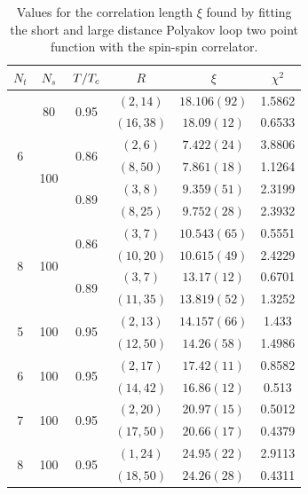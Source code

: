 \documentclass[reqno,12pt]{article}
\numberwithin{equation}{section}
\begin{document}
\begin{table}[h]
	\centering
	\begin{tabular}{|c|c|c|c|c|c|}
		\hline
		$N_t$ & $N_s$ & $\flatfrac{T}{T_c} $ & $R$ & $\xi$ & $\chi^2$ \\
		\hline
		\multirow{6}{*}{6} 
			& \multirow{2}{*}{80}
				& \multirow{2}{*}{0.95}
					& $(2, 14)$  & $18.106(92)$ & 1.5862 \\
				& & & $(16, 38)$ & $18.09(12)$  & 0.6533 \\
			\cline{2-6}
			& \multirow{4}{*}{100} 
				& \multirow{2}{*}{0.86} 
					& $(2, 6)$   & $7.422(24)$ & 3.8806 \\
					& & & $(8, 50)$ & $7.861(18)$  & 1.1264 \\
					\cline{3-6}
				& & \multirow{2}{*}{0.89} 
					& $(3, 8)$   & $9.359(51)$ & 2.3199 \\
					& & & $(8, 25)$  & $9.752(28)$ & 2.3932 \\
		\hline
		\multirow{4}{*}{8} & \multirow{4}{*}{100}
				& \multirow{2}{*}{0.86}
					& $(3, 7)$  & $10.543(65)$ & 0.5551 \\
				& & & $(10, 20)$ & $10.615(49)$  & 2.4229 \\
			\cline{3-6}
				& & \multirow{2}{*}{0.89}
					& $(3, 7)$   & $13.17(12)$  & 0.6701 \\
				& & & $(11, 35)$ & $13.819(52)$ & 1.3252 \\
		\hline
		\multirow{2}{*}{5} & \multirow{2}{*}{100} & \multirow{2}{*}{0.95}
			    & $(2, 13)$ & $14.157(66)$ & 1.433 \\
			& & & $(12, 50)$ & $14.26(58)$ & 1.4986 \\
		\hline
		\multirow{2}{*}{6} & \multirow{2}{*}{100} & \multirow{2}{*}{0.95}
			    & $(2, 17)$ & $17.42(11)$ & 0.8582 \\
			& & & $(14, 42)$ & $16.86(12)$ & 0.513 \\
		\hline
		\multirow{2}{*}{7} & \multirow{2}{*}{100} & \multirow{2}{*}{0.95}
			    & $(2, 20)$ & $20.97(15)$ & 0.5012 \\
			& & & $(17, 50)$ & $20.66(17)$ & 0.4379 \\
		\hline
		\multirow{2}{*}{8} & \multirow{2}{*}{100} & \multirow{2}{*}{0.95}
			    & $(1, 24)$ & $24.95(22)$ & 2.9113 \\
			& & & $(18, 50)$ & $24.26(28)$ & 0.4311 \\
		\hline
	\end{tabular}
\caption[Fitted correlation length]{Values for the correlation length $\xi$ found by fitting the short and large distance
	Polyakov loop two point function with the spin-spin correlator.}
\label{table:corr_length}
\end{table}
\end{document}
